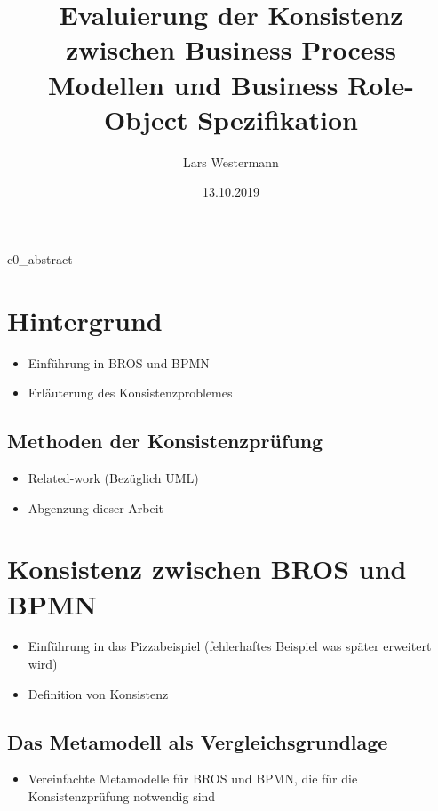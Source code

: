 \documentclass[ngerman]{tudscrreprt}
\begin{document}
\date{13.10.2019}
\author{Lars Westermann}
\title{Evaluierung der Konsistenz zwischen Business Process Modellen und Business Role-Object Spezifikation}
\supervisor{}
\maketitle

\tableofcontents

{c0_abstract}

\chapter{Hintergrund}

\begin{itemize}
  \item Einführung in BROS und BPMN
  \item Erläuterung des Konsistenzproblemes
\end{itemize}

\section{Methoden der Konsistenzprüfung}

\begin{itemize}
  \item Related-work (Bezüglich UML)
  \item Abgenzung dieser Arbeit
\end{itemize}

\chapter{Konsistenz zwischen BROS und BPMN}

\begin{itemize}
  \item Einführung in das Pizzabeispiel (fehlerhaftes Beispiel was später erweitert wird)
  \item Definition von Konsistenz
\end{itemize}

\section{Das Metamodell als Vergleichsgrundlage}

\begin{itemize}
  \item Vereinfachte Metamodelle für BROS und BPMN, die für die Konsistenzprüfung notwendig sind
\end{itemize}
\end{document}
